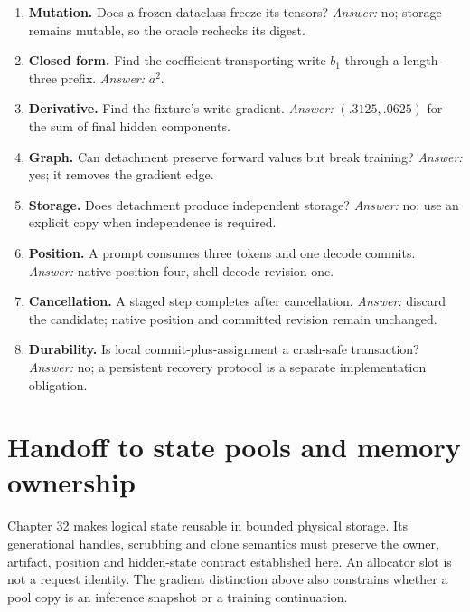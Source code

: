 \begin{enumerate}
\emph{Answer:} no; ordered strings are part of canonical content.
\item \textbf{Mutation.} Does a frozen dataclass freeze its tensors?
\emph{Answer:} no; storage remains mutable, so the oracle rechecks its digest.
\item \textbf{Closed form.} Find the coefficient transporting write $b_1$
through a length-three prefix. \emph{Answer:} $a^2$.
\item \textbf{Derivative.} Find the fixture's write gradient.
\emph{Answer:} $(.3125,.0625)$ for the sum of final hidden components.
\item \textbf{Graph.} Can detachment preserve forward values but break training?
\emph{Answer:} yes; it removes the gradient edge.
\item \textbf{Storage.} Does detachment produce independent storage?
\emph{Answer:} no; use an explicit copy when independence is required.
\item \textbf{Position.} A prompt consumes three tokens and one decode commits.
\emph{Answer:} native position four, shell decode revision one.
\item \textbf{Cancellation.} A staged step completes after cancellation.
\emph{Answer:} discard the candidate; native position and committed revision
remain unchanged.
\item \textbf{Durability.} Is local commit-plus-assignment a crash-safe
transaction? \emph{Answer:} no; a persistent recovery protocol is a separate
implementation obligation.
\end{enumerate}

\section{Handoff to state pools and memory ownership}
Chapter 32 makes logical state reusable in bounded physical storage.
Its generational handles, scrubbing and clone semantics must preserve the
owner, artifact, position and hidden-state contract established here. An
allocator slot is not a request identity. The gradient distinction above also
constrains whether a pool copy is an inference snapshot or a training continuation.
